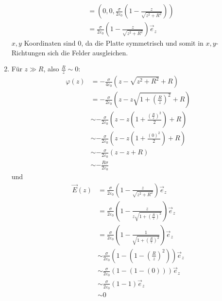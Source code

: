 \documentclass[sectionformat=aufgabe]{gadsescript}
\begin{document}
\begin{enumerate}[label=\alph*)]
\begin{align*}
			&= \left( 0, 0, \frac{ \sigma }{ 2 \varepsilon _0 } \left( 1 - \frac{z}{ \sqrt{z^2 + R^2}  }  \right) \right)  \\
			&= \frac{ \sigma }{ 2 \varepsilon _0 } \left( 1 - \frac{z}{ \sqrt{z^2 + R^2}  } \right) \vec e_z
		\end{align*}
		$ x, y $ Koordinaten sind 0, da die Platte symmetrisch und somit in $ x, y $-Richtungen sich die Felder ausgleichen.
	\item 
		Für $ z \gg R $, also $ \frac{ R }{ z } \sim 0 $:
		\begin{align*}
			\varphi(z) &= -\frac{ \sigma }{ 4 \varepsilon _0 } \left( z - \sqrt{z^2 + R^2} + R \right) \\
			 &= -\frac{ \sigma }{ 2 \varepsilon _0 } \left( z - z\sqrt{1 + \left( \frac{ R }{ z }  \right) ^2} + R \right) \\
			 &\sim -\frac{ \sigma }{ 2 \varepsilon _0 } \left( z - z\left( 1 + \frac{ \left( \frac{ R }{ z }  \right) ^2 }{ 2 } \right) + R \right) \\
			 &\sim -\frac{ \sigma }{ 2 \varepsilon _0 } \left( z - z\left( 1 + \frac{ \left( 0 \right) ^2 }{ 2 } \right) + R \right) \\
			 &\sim -\frac{ \sigma }{ 2 \varepsilon _0 } \left( z - z + R \right) \\
			 &\sim -\frac{ R\sigma }{ 2 \varepsilon _0 } 
		\end{align*}
		und
		\begin{align*}
			\vec E(z) &= \frac{ \sigma }{ 2 \varepsilon _0 } \left( 1 - \frac{z}{ \sqrt{z^2 + R^2}  } \right) \vec e_z \\
			&= \frac{ \sigma }{ 2 \varepsilon _0 } \left( 1 - \frac{z}{ z \sqrt{1 + \left( \frac{ R }{ z }  \right) ^2}  } \right) \vec e_z \\
			&= \frac{ \sigma }{ 2 \varepsilon _0 } \left( 1 - \frac{1}{ \sqrt{1 + \left( \frac{ R }{ z }  \right) ^2}  } \right) \vec e_z \\
			&\sim \frac{ \sigma }{ 2 \varepsilon _0 } \left( 1 - \left( 1 - \left( \frac{ R }{ z }  \right) ^2 \right) \right) \vec e_z \\
			&\sim \frac{ \sigma }{ 2 \varepsilon _0 } \left( 1 - \left( 1 - \left( 0 \right) \right)\right) \vec e_z \\
			&\sim \frac{ \sigma }{ 2 \varepsilon _0 } \left( 1 - 1 \right) \vec e_z \\
			&\sim 0
		\end{align*}
		

\end{enumerate}
\end{document}
